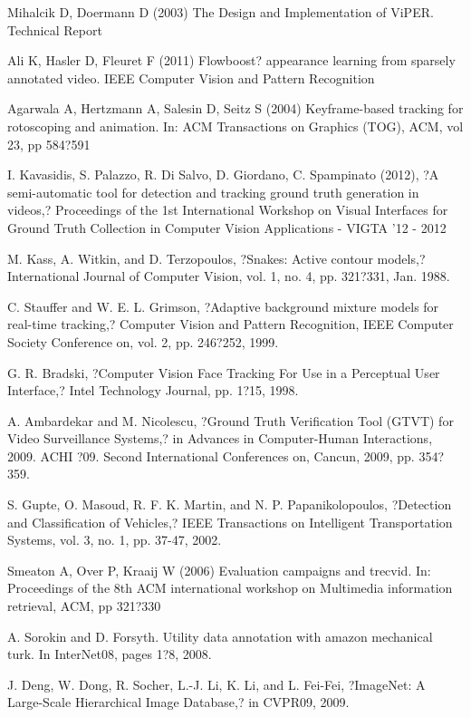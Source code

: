 \documentclass[conference]{IEEEtran}
\begin{document}
\begin{thebibliography}{9}
Mihalcik D, Doermann D (2003) The Design and Implementation of ViPER. Technical Report 

Ali K, Hasler D, Fleuret F (2011) Flowboost? appearance learning from sparsely annotated video. IEEE Computer Vision and Pattern Recognition 

Agarwala A, Hertzmann A, Salesin D, Seitz S (2004) Keyframe-based tracking for rotoscoping and animation. In: ACM Transactions on Graphics (TOG), ACM, vol 23, pp 584?591

I. Kavasidis, S. Palazzo, R. Di Salvo, D. Giordano, C. Spampinato (2012), ?A semi-automatic tool for detection and tracking ground truth generation in videos,? Proceedings of the 1st International Workshop on Visual Interfaces for Ground Truth Collection in Computer Vision Applications - VIGTA '12 - 2012

M. Kass, A. Witkin, and D. Terzopoulos, ?Snakes: Active contour models,? International Journal of Computer Vision, vol. 1, no. 4, pp. 321?331, Jan. 1988.	

C. Stauffer and W. E. L. Grimson, ?Adaptive background mixture models for real-time tracking,? Computer Vision and Pattern Recognition, IEEE Computer Society Conference on, vol. 2, pp. 246?252, 1999.

G. R. Bradski, ?Computer Vision Face Tracking For Use in a Perceptual User Interface,? Intel Technology Journal, pp. 1?15, 1998.

A. Ambardekar and M. Nicolescu, ?Ground Truth Verification Tool (GTVT) for Video Surveillance Systems,? in Advances in Computer-Human Interactions, 2009. ACHI ?09. Second International Conferences on, Cancun, 2009, pp. 354?359.	

S. Gupte, O. Masoud, R. F. K. Martin, and N. P. Papanikolopoulos, ?Detection and Classification of Vehicles,? IEEE Transactions on Intelligent Transportation Systems, vol. 3, no. 1, pp. 37-47, 2002. 

Smeaton A, Over P, Kraaij W (2006) Evaluation campaigns and trecvid. In: Proceedings of the 8th ACM international workshop on Multimedia information retrieval, ACM, pp 321?330

A. Sorokin and D. Forsyth. Utility data annotation with amazon mechanical turk. In InterNet08, pages 1?8, 2008.

J. Deng, W. Dong, R. Socher, L.-J. Li, K. Li, and L. Fei-Fei, ?ImageNet: A Large-Scale Hierarchical Image Database,? in CVPR09, 2009.

\end{thebibliography}
\end{document}
